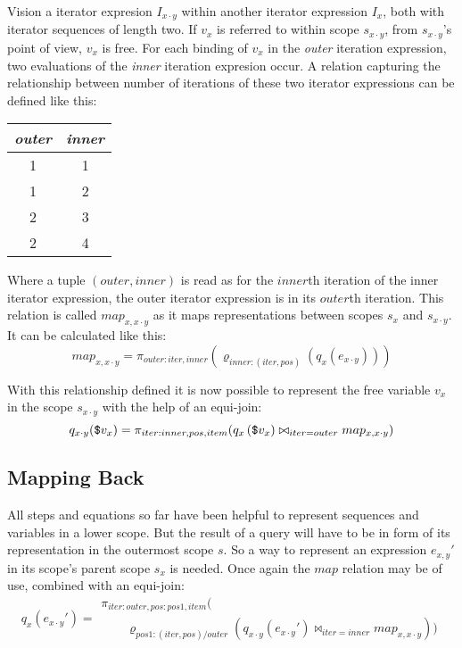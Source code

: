 Vision a iterator expresion $I_{x \cdot y}$ within another iterator expression $I_{x}$, both with iterator
sequences of length two. If $v_{x}$ is referred to within scope $s_{x \cdot y}$, from $s_{x \cdot y}$'s point of
view, $v_{x}$ is free. For each binding of $v_{x}$ in the \textit{outer} iteration expression, two
evaluations of the \textit{inner} iteration expresion occur. A relation capturing the relationship between number
of iterations of these two iterator expressions can be defined like this:
\begin{center}
\begin{tabular}{|c|c|}\hline
\textit{outer}	& \textit{inner} 	\\ \hline
1				& 1		\\ \hline
1				& 2		\\ \hline
2				& 3		\\ \hline
2				& 4		\\ \hline
\end{tabular}
\end{center}
Where a tuple $(outer, inner)$ is read as for the $inner$th iteration of the inner iterator expression, the outer
iterator expression is in its $outer$th iteration. This relation is called $map_{x, x\cdot y}$ as it maps
representations between scopes $s_{x}$ and $s_{x \cdot y}$. It can be calculated like this:
\begin{equation}
map_{x, x\cdot y} = \pi_{outer:iter,inner}(\varrho_{inner:(iter,pos)}(q_{x}(e_{x \cdot y})))
\label{eq:ll:mapx_xy}
\end{equation}

With this relationship defined it is now possible to represent the free variable $v_{x}$ in the scope $s_{x \cdot
y}$ with the help of an equi-join:
\begin{equation}
q_{x \cdot y}(\mbox{\texttt{\$}}v_{x}) = \pi_{iter:inner, pos,
item}(q_{x}\left(\mbox{\texttt{\$}}v_{x})\bowtie_{iter=outer} map_{x, x \cdot y}\right)
\label{eq:ll:qxy_vx}
\end{equation}

\subsection{Mapping Back}
\label{sect:translation:ll:mappingBack}

All steps and equations so far have been helpful to represent sequences and variables in a lower scope. But the
result of a query will have to be in form of its representation in the outermost scope $s$. So a way to represent
an expression $e_{x,y}'$ in its scope's parent scope $s_{x}$ is needed. Once again the $map$ relation may be of
use, combined with an equi-join:
\begin{equation}
q_{x}(e_{x \cdot y}') =
\begin{array}{l}
 \pi_{iter:outer, pos:pos1, item}(\\ \qquad\varrho_{pos1:(iter,pos)/outer}(q_{x \cdot
y}(e_{x \cdot y}')\bowtie_{iter = inner}map_{x, x \cdot y}))
\end{array}
\label{eq:ll:qx_exymark}
\end{equation}



